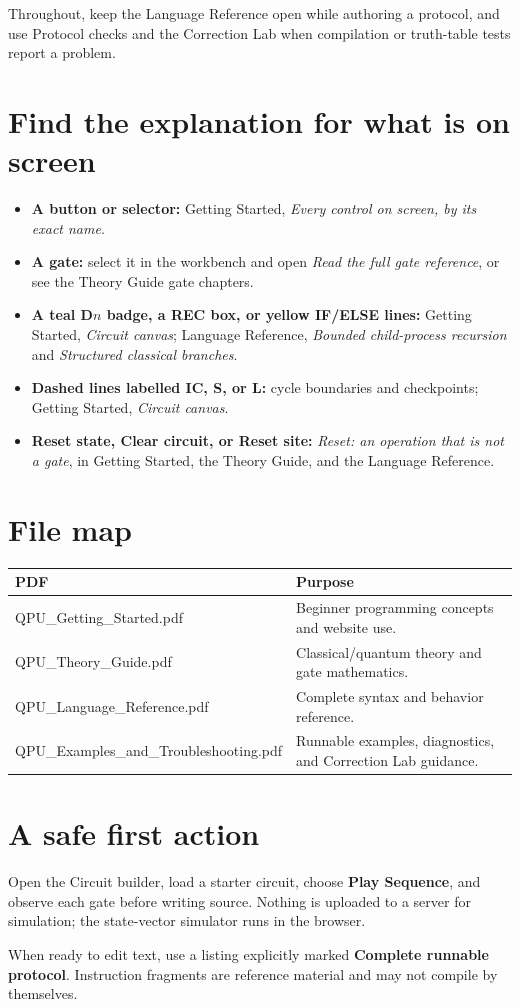 Throughout, keep the Language Reference open while authoring a protocol, and
use Protocol checks and the Correction Lab when compilation or truth-table
tests report a problem.

\section{Find the explanation for what is on screen}

\begin{itemize}
  \item \textbf{A button or selector:} Getting Started, \emph{Every control on
  screen, by its exact name}.
  \item \textbf{A gate:} select it in the workbench and open \emph{Read the
  full gate reference}, or see the Theory Guide gate chapters.
  \item \textbf{A teal D$n$ badge, a REC box, or yellow IF/ELSE lines:}
  Getting Started, \emph{Circuit canvas}; Language Reference,
  \emph{Bounded child-process recursion} and \emph{Structured classical
  branches}.
  \item \textbf{Dashed lines labelled IC, S, or L:} cycle boundaries and
  checkpoints; Getting Started, \emph{Circuit canvas}.
  \item \textbf{Reset state, Clear circuit, or Reset site:} \emph{Reset: an
  operation that is not a gate}, in Getting Started, the Theory Guide, and the
  Language Reference.
\end{itemize}

\section{File map}

\begin{tabularx}{\textwidth}{>{\ttfamily}p{}X}
\toprule
\normalfont\bfseries PDF & \bfseries Purpose\\
\midrule
QPU\_Getting\_Started.pdf & Beginner programming concepts and website use.\\
QPU\_Theory\_Guide.pdf & Classical/quantum theory and gate mathematics.\\
QPU\_Language\_Reference.pdf & Complete syntax and behavior reference.\\
QPU\_Examples\_and\_Troubleshooting.pdf & Runnable examples, diagnostics, and
Correction Lab guidance.\\
\bottomrule
\end{tabularx}

\section{A safe first action}

Open the Circuit builder, load a starter circuit, choose \textbf{Play Sequence},
and observe each gate before writing source. Nothing is uploaded to a server for
simulation; the state-vector simulator runs in the browser.

When ready to edit text, use a listing explicitly marked
\textbf{Complete runnable protocol}. Instruction fragments are reference
material and may not compile by themselves.


